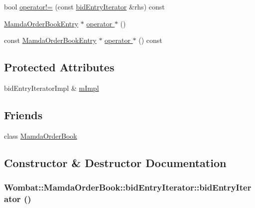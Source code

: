 \begin{CompactItemize}
\item 
bool \hyperlink{classWombat_1_1MamdaOrderBook_1_1bidEntryIterator_f036e5ee7bf309762560ba30ef4c4dd9}{operator!=} (const \hyperlink{classWombat_1_1MamdaOrderBook_1_1bidEntryIterator}{bid\-Entry\-Iterator} \&rhs) const 
\item 
\hyperlink{classWombat_1_1MamdaOrderBookEntry}{Mamda\-Order\-Book\-Entry} $\ast$ \hyperlink{classWombat_1_1MamdaOrderBook_1_1bidEntryIterator_750f4cd3d8a71fd104995d77c7793bda}{operator $\ast$} ()
\item 
const \hyperlink{classWombat_1_1MamdaOrderBookEntry}{Mamda\-Order\-Book\-Entry} $\ast$ \hyperlink{classWombat_1_1MamdaOrderBook_1_1bidEntryIterator_442542df25b5e0acb413522e8f1cadcd}{operator $\ast$} () const 
\end{CompactItemize}
\subsection*{Protected Attributes}
\begin{CompactItemize}
\item 
bid\-Entry\-Iterator\-Impl \& \hyperlink{classWombat_1_1MamdaOrderBook_1_1bidEntryIterator_203fbd1225442e13f29f89356b167e67}{m\-Impl}
\end{CompactItemize}
\subsection*{Friends}
\begin{CompactItemize}
\item 
class \hyperlink{classWombat_1_1MamdaOrderBook_1_1bidEntryIterator_51cb271c9914c74f99c60cb638c26be7}{Mamda\-Order\-Book}
\end{CompactItemize}


\subsection{Constructor \& Destructor Documentation}
\hypertarget{classWombat_1_1MamdaOrderBook_1_1bidEntryIterator_788b9277e9d0496c76059a792d2a102c}{
\subsubsection[bidEntryIterator]{\setlength{\rightskip}{0pt plus 5cm}Wombat::Mamda\-Order\-Book::bid\-Entry\-Iterator::bid\-Entry\-Iterator ()}}
\label{classWombat_1_1MamdaOrderBook_1_1bidEntryIterator_788b9277e9d0496c76059a792d2a102c}


